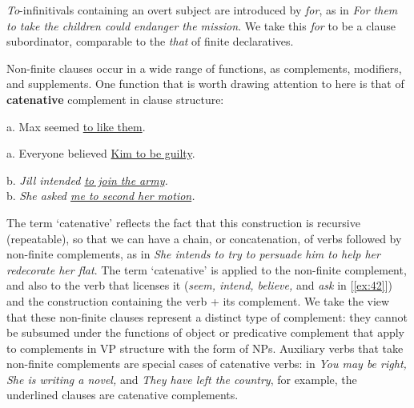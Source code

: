\textit{To}-infinitivals containing an overt subject are introduced by \textit{for}, as in \ob\textit{For them to take the children could endanger the mission}\cb. We take this \textit{for} to be a clause subordinator, comparable to the \textit{that} of finite declaratives.

Non-finite clauses occur in a wide range of functions, as complements, modifiers, and supplements. One function that is worth drawing attention to here is that of \textbf{catenative} complement in clause structure:
\begin{examples}
\item \label{ex:42}
\noindent\begin{minipage}[t]{0.5\linewidth}\vspace{-6pt}
    \begin{examples}
        \item \label{ex:42i}\textnormal{a.} Max seemed \uline{to like them}.
        \item  \label{ex:42ii}\textnormal{a.} Everyone believed \uline{Kim to be guilty}.
    \end{examples}
\end{minipage}\vspace{-\medskipamount}%
\begin{minipage}[t]{0.5\linewidth}
    b. \textit{Jill intended \uline{to join the army}.}\\
    b. \textit{She asked \uline{me to second her motion}.}
\end{minipage}
\end{examples}
The term `catenative' reflects the fact that this construction is recursive (repeatable), so that we can have a chain, or concatenation, of verbs followed by non-finite complements, as in \textit{She intends to try to persuade him to help her redecorate her flat}. The term `catenative' is applied to the non-finite complement, and also to the verb that licenses it (\textit{seem, intend, believe,} and \textit{ask} in [\ref{ex:42}]) and the construction containing the verb + its complement. We take the view that these non-finite clauses represent a distinct type of complement: they cannot be subsumed under the functions of object or predicative complement that apply to complements in VP structure with the form of NPs. Auxiliary verbs that take non-finite complements are special cases of catenative verbs: in \textit{You may be right, She is writing a novel,} and \textit{They have left the country}, for example, the underlined clauses are catenative complements.

